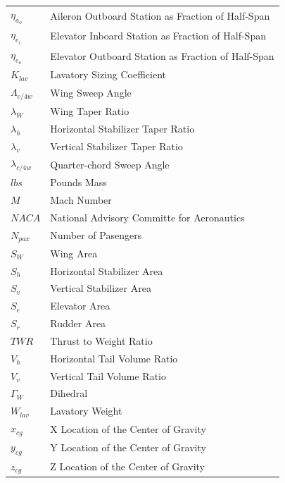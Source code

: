 \documentclass[conf]{new-aiaa}
\begin{document}
{\begin{longtable*}{@{}l @{\quad=\quad} l@{}}
$\eta_{a_o}$               & Aileron Outboard Station as Fraction of Half-Span \\
$\eta_{e_i}$               & Elevator Inboard Station as Fraction of Half-Span \\
$\eta_{e_o}$               & Elevator Outboard Station as Fraction of Half-Span \\
$K_{lav}$                  & Lavatory Sizing Coefficient \\
$\Lambda_{c/4w}$           & Wing Sweep Angle                   \\
$\lambda_W$	               & Wing Taper Ratio                        \\
$\lambda_h$	               & Horizontal Stabilizer Taper Ratio                        \\
$\lambda_v$	               & Vertical Stabilizer Taper Ratio                        \\
$\lambda_{c/4w}$           & Quarter-chord Sweep Angle          \\
$lbs$                      & Pounds Mass \\
$M$                        & Mach Number \\
$NACA$                     & National Advisory Committe for Aeronautics \\
$N_{pax}$                  & Number of Pasengers \\
$S_W$     	               & Wing Area                          \\
$S_h$     	               & Horizontal Stabilizer Area \\
$S_v$     	               & Vertical Stabilizer Area  \\
$S_e$     	               & Elevator Area  \\
$S_r$     	               & Rudder Area  \\
$TWR$     	               & Thrust to Weight Ratio             \\
$V_h$     	               & Horizontal Tail Volume Ratio \\
$V_v$     	               & Vertical Tail Volume Ratio \\
$\Gamma_W$	               & Dihedral                           \\
$W_{lav}$	               & Lavatory Weight                           \\
$x_{cg}$	               & X Location of the Center of Gravity \\
$y_{cg}$	               & Y Location of the Center of Gravity \\
$z_{cg}$	               & Z Location of the Center of Gravity \\
\end{longtable*}}
\end{document}
